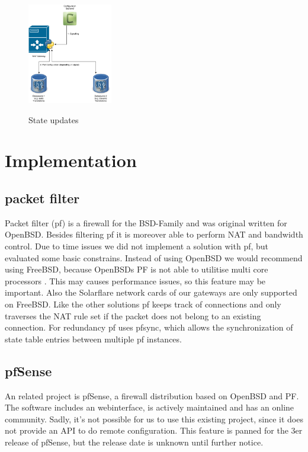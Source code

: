 \documentclass{report}
\begin{document}
\begin{figure}[ht]
	\centering
	\includegraphics[width=0.33\textwidth]{../ApplicationDeployment.pdf}
	\label{ApplicationDeployment.png}
	\caption{State updates}  
\end{figure}

\chapter{Implementation}\label{implementation}

\section{packet filter}\label{packet-filter}

Packet filter (pf)\cite{pf}\cite{pfOpenBSD} is a firewall for the BSD-Family and was
original written for OpenBSD. Besides filtering pf it is moreover able to perform NAT
and bandwidth control. Due to time issues we did not implement a
solution with pf, but evaluated some basic constrains. Instead of using
OpenBSD we would recommend using FreeBSD, because OpenBSDs PF is not able to
utilitise multi core processors \cite{pfOpenBSDperf}. This may causes performance issues,
so this feature may be important. Also the Solarflare network cards of our gateways are
only supported on FreeBSD. Like the other solutions pf keeps track of
connections and only traverses the NAT rule set if the packet does not
belong to an existing connection. For redundancy pf uses pfsync\cite{pfsync},
which allows the synchronization of state table entries between
multiple pf instances.

\section{pfSense}\label{pfsense}

An related project is pfSense\cite{pfsense}, a firewall distribution based on
OpenBSD and PF. The software includes an webinterface, is actively
maintained and has an online community. Sadly, it's not possible for us
to use this existing project, since it does not provide an API to do
remote configuration. This feature is panned for the 3er release of
pfSense, but the release date is unknown until further notice.
\end{document}
